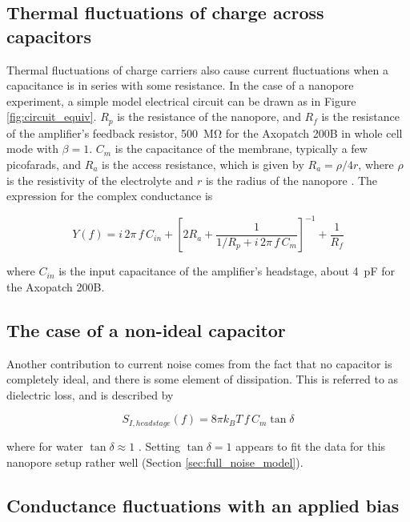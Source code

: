 \subsection{Thermal fluctuations of charge across capacitors}

Thermal fluctuations of charge carriers also cause current fluctuations when a capacitance is in series with some resistance.  In the case of a nanopore experiment, a simple model electrical circuit can be drawn as in Figure \ref{fig:circuit_equiv}.  $R_p$ is the resistance of the nanopore, and $R_f$ is the resistance of the amplifier's feedback resistor, \SI{500}{\mega\ohm} for the Axopatch 200B in whole cell mode with $\beta = 1$.  $C_m$ is the capacitance of the membrane, typically a few picofarads, and $R_a$ is the access resistance, which is given by $R_a = \rho/4r$, where $\rho$ is the resistivity of the electrolyte and $r$ is the radius of the nanopore \citep{Hall1975}.  The expression for the complex conductance is

\begin{equation}
Y(f) = i \, 2 \pi \, f \, C_{in} + \left[ 2 R_a + \frac{1}{ 1/R_p + i \, 2 \pi \, f \, C_m } \right]^{-1} + \frac{1}{R_f}
\label{eqn:admittance_model}
\end{equation}

\noindent
where $C_{in}$ is the input capacitance of the amplifier's headstage, about \SI{4}{\pF} for the Axopatch 200B.

\subsection{The case of a non-ideal capacitor}

Another contribution to current noise comes from the fact that no capacitor is completely ideal, and there is some element of dissipation.  This is referred to as dielectric loss, and is described by \citep{Sakmann1995}

\begin{equation}
S_{I,headstage}(f) = 8 \pi k_B T \, f \, C_m \tan \delta
\label{eqn:dielectric}
\end{equation}

\noindent
where for water $\tan \delta \approx 1$ \citep{Gaiduk2006,Hoogerheide2010}.  Setting $\tan \delta = 1$ appears to fit the data for this nanopore setup rather well (Section \ref{sec:full_noise_model}).

\subsection{Conductance fluctuations with an applied bias}
\label{sec:ion_number_fluctuations}

